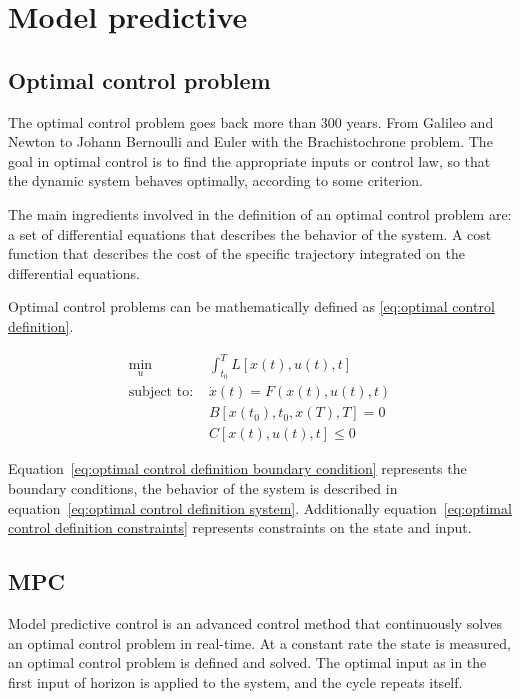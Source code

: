 \chapter{Model predictive}
\section{Optimal control problem}
	The optimal control problem goes back more than 300 years. From Galileo and Newton to Johann Bernoulli and Euler with the Brachistochrone problem. The goal in optimal control is to find the appropriate inputs or control law, so that the dynamic system behaves optimally, according to some criterion. 
	
	The main ingredients involved in the definition of an optimal control problem are: a set of differential equations that describes the behavior of the system. A cost function that describes the cost of the specific trajectory integrated on the differential equations.
	
	Optimal control problems can be mathematically defined as \eqref{eq:optimal control definition}.
	
	\begin{subequations}\label{eq:optimal control definition}
		\begin{alignat}{4}
		\min_u \ & \int_{t_0}^{T} L[x(t),u(t),t] \label{eq:optimal control definition cost}\\ 
		\text{subject to: } & \dot{x}(t) = F(x(t),u(t),t) \label{eq:optimal control definition system}\\
		& B[x(t_0),t_0,x(T),T]=0  \label{eq:optimal control definition boundary condition}\\
		& C[x(t),u(t),t]\le 0  \label{eq:optimal control definition constraints}
		\end{alignat}
	\end{subequations}
	
	Equation~\ref{eq:optimal control definition boundary condition} represents the boundary conditions, the behavior of the system is described in equation~\ref{eq:optimal control definition system}. Additionally equation~\ref{eq:optimal control definition constraints} represents constraints on the state and input.

\section{MPC}
	Model predictive control is an advanced control method that continuously solves an  optimal control problem in real-time. At a constant rate the state is measured, an optimal control problem is defined and solved. The optimal input as in the first input of horizon is applied to the system, and the cycle repeats itself.
	
